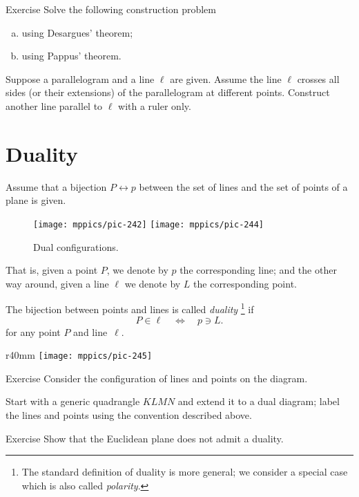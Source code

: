 \begin{thm}{Exercise}\label{ex:desargues-construction}
Solve the following construction problem
\begin{enumerate}[(a)]
\item\label{ex:desargues-construction:desargues} using Desargues' theorem;
\item\label{ex:desargues-construction:pappus} using Pappus' theorem.
\end{enumerate}
Suppose a parallelogram and a line $\ell$ are given.
Assume the line $\ell$ crosses all sides (or their extensions) of the parallelogram at different points. 
Construct another line parallel to $\ell$ with a ruler only.
\end{thm}


\section{Duality}

Assume that a bijection $P\leftrightarrow p$ between the set of lines and the set of points of a plane is given.
\begin{figure}[!ht]
\centering
\texttt{[image: mppics/pic-242]}
\hskip15mm
\texttt{[image: mppics/pic-244]}
\caption*{Dual configurations.}
\end{figure}
That is,
given a point $P$, we denote by $p$ the corresponding line;
and the other way around, 
given a line $\ell$ we denote by $L$ the corresponding point. 

The bijection between points and lines is called \emph{duality}\label{page:duality}%
\footnote{The standard definition of duality is more general; we consider a special case which is also called \emph{polarity}.}
if 
\[P\in \ell
\quad
\iff
\quad 
p\ni L.\]
for any point $P$ and line~$\ell$.

{

\begin{wrapfigure}{r}{40mm}
\vskip-4mm
\centering
\texttt{[image: mppics/pic-245]}
\end{wrapfigure}

\begin{thm}{Exercise}\label{ex:dual-configurations}
Consider the configuration of lines and points on the diagram.

Start with a generic quadrangle $KLMN$ and extend it to a dual diagram; label the lines and points using the convention described above.
\end{thm}

\begin{thm}{Exercise}\label{ex:dual-euclid}
Show that the Euclidean plane does not admit a duality. 
\end{thm}

}

